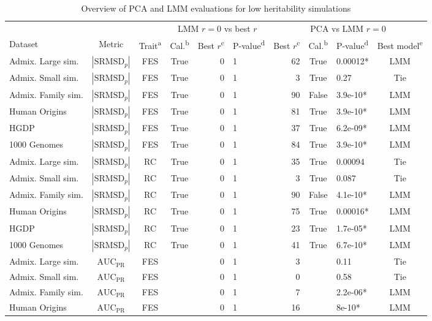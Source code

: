 \documentclass[9pt,lineno]{elife}
\newcommand{\rmsd}{\text{SRMSD}_p}
\newcommand{\auc}{\text{AUC}_\text{PR}}
\begin{document}
\begin{table}[bt]
  \begin{fullwidth}
    \caption{Overview of PCA and LMM evaluations for low heritability simulations}
    \label{tab:human_sum_pcs_h3}
    \begin{tabular}{lcc|crl|rclc}
      \toprule
      & & & \multicolumn{3}{c|}{LMM $r=0$ vs best $r$} & \multicolumn{4}{c}{PCA vs LMM $r=0$} \\
      Dataset & Metric & {Trait\textsuperscript{a}} & {Cal.\textsuperscript{b}} & {Best $r$\textsuperscript{c}} & {P-value\textsuperscript{d}} & {Best $r$\textsuperscript{c}} & {Cal.\textsuperscript{b}} & {P-value\textsuperscript{d}} & {Best model\textsuperscript{e}} \\
      \midrule
      Admix. Large sim.	&$|\rmsd|$	&FES	&True	&0	&1	&62	&True	&0.00012*	&LMM \\
      Admix. Small sim.	&$|\rmsd|$	&FES	&True	&0	&1	&3	&True	&0.27	&Tie \\
      Admix. Family sim.	&$|\rmsd|$	&FES	&True	&0	&1	&90	&False	&3.9e-10*	&LMM \\
      Human Origins	&$|\rmsd|$	&FES	&True	&0	&1	&81	&True	&3.9e-10*	&LMM \\
      HGDP	&$|\rmsd|$	&FES	&True	&0	&1	&37	&True	&6.2e-09*	&LMM \\
      1000 Genomes	&$|\rmsd|$	&FES	&True	&0	&1	&84	&True	&3.9e-10*	&LMM \\
      Admix. Large sim.	&$|\rmsd|$	&RC	&True	&0	&1	&35	&True	&0.00094	&Tie \\
      Admix. Small sim.	&$|\rmsd|$	&RC	&True	&0	&1	&3	&True	&0.087	&Tie \\
      Admix. Family sim.	&$|\rmsd|$	&RC	&True	&0	&1	&90	&False	&4.1e-10*	&LMM \\
      Human Origins	&$|\rmsd|$	&RC	&True	&0	&1	&75	&True	&0.00016*	&LMM \\
      HGDP	&$|\rmsd|$	&RC	&True	&0	&1	&23	&True	&1.7e-05*	&LMM \\
      1000 Genomes	&$|\rmsd|$	&RC	&True	&0	&1	&41	&True	&6.7e-10*	&LMM \\
      Admix. Large sim.	&$\auc$	&FES	&	&0	&1	&3	&	&0.11	&Tie \\
      Admix. Small sim.	&$\auc$	&FES	&	&0	&1	&0	&	&0.58	&Tie \\
      Admix. Family sim.	&$\auc$	&FES	&	&0	&1	&7	&	&2.2e-06*	&LMM \\
      Human Origins	&$\auc$	&FES	&	&0	&1	&16	&	&8e-10*	&LMM \\

\end{tabular}
\end{fullwidth}
\end{table}
\end{document}
